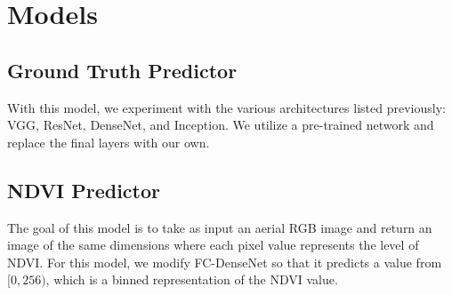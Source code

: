 \section{Models}

\subsection{Ground Truth Predictor}
With this model, we experiment with the various architectures listed previously: VGG, ResNet, DenseNet, and Inception. We utilize a pre-trained network and replace the final layers with our own.

\subsection{NDVI Predictor}
The goal of this model is to take as input an aerial RGB image and return an image of the same dimensions where each pixel value represents the level of NDVI. For this model, we modify FC-DenseNet so that it predicts a value from $[0, 256)$, which is a binned representation of the NDVI value.